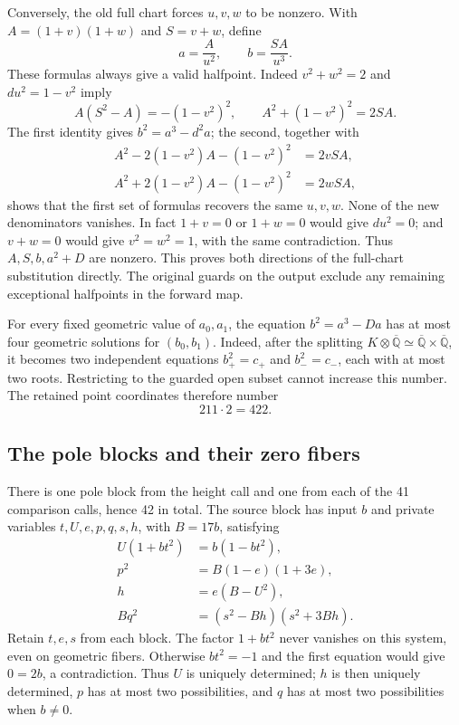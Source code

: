 Conversely, the old full chart forces $u,v,w$ to be nonzero.
With $A=(1+v)(1+w)$ and $S=v+w$, define
\[
 a=\frac{A}{u^2},\qquad b=\frac{SA}{u^3}.
\]
These formulas always give a valid halfpoint.  Indeed
$v^2+w^2=2$ and $du^2=1-v^2$ imply
\[
 A(S^2-A)=-(1-v^2)^2,\qquad
 A^2+(1-v^2)^2=2SA.
\]
The first identity gives $b^2=a^3-d^2a$; the second, together with
\begin{align*}
 A^2-2(1-v^2)A-(1-v^2)^2&=2vSA,\\
 A^2+2(1-v^2)A-(1-v^2)^2&=2wSA,
\end{align*}
shows that the first set of formulas recovers the same $u,v,w$.
None of the new denominators
vanishes.  In fact $1+v=0$ or $1+w=0$ would give $du^2=0$; and
$v+w=0$ would give $v^2=w^2=1$, with the same contradiction.
Thus $A,S,b,a^2+D$ are nonzero.  This proves both directions of the
full-chart substitution directly.  The original guards on the output
exclude any remaining exceptional halfpoints in the forward map.

For every fixed geometric value of $a_0,a_1$, the equation
$b^2=a^3-Da$ has at most four geometric solutions for $(b_0,b_1)$.
Indeed, after the splitting
$K\otimes\overline{\mathbb Q}\simeq
\overline{\mathbb Q}\times\overline{\mathbb Q}$, it becomes two
independent equations $b_+^2=c_+$ and $b_-^2=c_-$, each with at most
two roots.  Restricting to the guarded open subset cannot increase
this number.  The retained point coordinates therefore number
\[
 211\cdot2=422.
\]

\subsection{The pole blocks and their zero fibers}

There is one pole block from the height call and one from each of the
41 comparison calls, hence 42 in total.  The source block has input
$b$ and private variables $t,U,e,p,q,s,h$, with $B=17b$, satisfying
\begin{align*}
 U(1+bt^2)&=b(1-bt^2),\\
 p^2&=B(1-e)(1+3e),\\
 h&=e(B-U^2),\\
 Bq^2&=(s^2-Bh)(s^2+3Bh).
\end{align*}
Retain $t,e,s$ from each block.  The factor $1+bt^2$ never vanishes
on this system, even on geometric fibers.  Otherwise $bt^2=-1$ and
the first equation would give $0=2b$, a contradiction.  Thus $U$ is
uniquely determined; $h$ is then uniquely determined, $p$ has at most
two possibilities, and $q$ has at most two possibilities when $b\ne0$.

